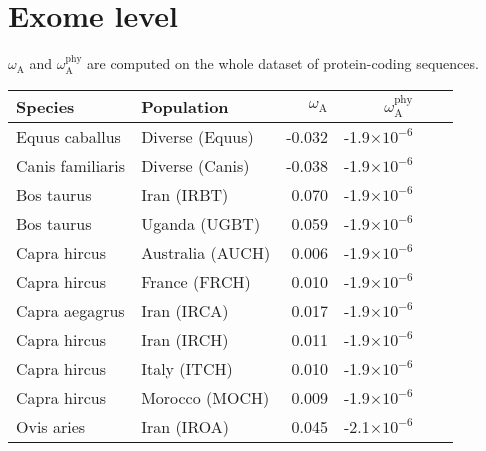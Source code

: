 \documentclass{article}
\begin{document}
    \section{Exome level}
    $\omega_{\mathrm{A}}$ and $\omega_{\mathrm{A}}^{\mathrm{phy}}$ are computed on the whole dataset of protein-coding sequences.
    \begin{table*}[!ht]
        \centering
        \begin{adjustbox}{width = 1\textwidth}
            \small
            \begin{tabular}{|l|l|r|r|r|r|}
                \toprule
                Species             & Population                     & $\omega_{\mathrm{A}}$ & $\omega_{\mathrm{A}}^{\mathrm{phy}}$ \\
                \midrule
                Equus caballus      & Diverse (Equus)                & -0.032                & -1.9$\times 10^{-6}$                 \\
                Canis familiaris    & Diverse (Canis)                & -0.038                & -1.9$\times 10^{-6}$                 \\
                Bos taurus          & Iran (IRBT)                    & 0.070                 & -1.9$\times 10^{-6}$                 \\
                Bos taurus          & Uganda (UGBT)                  & 0.059                 & -1.9$\times 10^{-6}$                 \\
                Capra hircus        & Australia (AUCH)               & 0.006                 & -1.9$\times 10^{-6}$                 \\
                Capra hircus        & France (FRCH)                  & 0.010                 & -1.9$\times 10^{-6}$                 \\
                Capra aegagrus      & Iran (IRCA)                    & 0.017                 & -1.9$\times 10^{-6}$                 \\
                Capra hircus        & Iran (IRCH)                    & 0.011                 & -1.9$\times 10^{-6}$                 \\
                Capra hircus        & Italy (ITCH)                   & 0.010                 & -1.9$\times 10^{-6}$                 \\
                Capra hircus        & Morocco (MOCH)                 & 0.009                 & -1.9$\times 10^{-6}$                 \\
                Ovis aries          & Iran (IROA)                    & 0.045                 & -2.1$\times 10^{-6}$                 \\

\end{tabular}
\end{adjustbox}
\end{table*}
\end{document}
